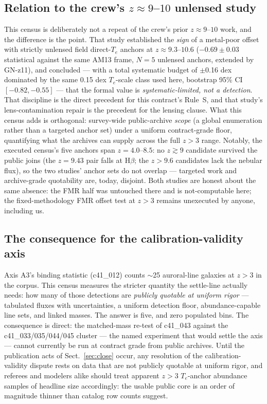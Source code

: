 \documentclass[twocolumn]{aastex702}
\newcommand{\te}{$T_e$}
\begin{document}
\subsection{Relation to the crew's $z\approx9$--$10$ unlensed study}\label{sec:z910}

This census is deliberately not a repeat of the crew's prior $z\approx9$--$10$
work, and the difference is the point. That study established the \emph{sign} of
a metal-poor offset with strictly unlensed field direct-\te{} anchors at
$z\approx9.3$--$10.6$ ($-0.69\pm0.03$ statistical against the same AM13 frame,
$N=5$ unlensed anchors, extended by GN-z11), and concluded --- with a total
systematic budget of $\pm$0.16 dex dominated by the same 0.15 dex \te{}-scale
class used here, bootstrap 95\% CI $[-0.82,-0.55]$ --- that the formal value is
\emph{systematic-limited, not a detection}. That discipline is the direct
precedent for this contract's Rule~S, and that study's lens-contamination repair
is the precedent for the lensing clause. What this census adds is orthogonal:
survey-wide public-archive \emph{scope} (a global enumeration rather than a
targeted anchor set) under a uniform contract-grade floor, quantifying what the
archives can supply across the full $z>3$ range. Notably, the executed census's
five anchors span $z=4.0$--$8.5$: no $z\gtrsim9$ candidate survived the public
joins (the $z=9.43$ pair falls at H$\beta$; the $z>9.6$ candidates lack the
nebular flux), so the two studies' anchor sets do not overlap --- targeted work
and archive-grade quotability are, today, disjoint. Both studies are honest about
the same absence: the FMR half was untouched there and is not-computable here;
the fixed-methodology FMR offset test at $z>3$ remains unexecuted by anyone,
including us.

\subsection{The consequence for the calibration-validity axis}\label{sec:a3}

Axis A3's binding statistic (c41\_012) counts $\sim$25 auroral-line galaxies at
$z>3$ in the corpus. This census measures the stricter quantity the settle-line
actually needs: how many of those detections are \emph{publicly quotable at
uniform rigor} --- tabulated fluxes with uncertainties, a uniform detection floor,
abundance-capable line sets, and linked masses. The answer is five, and zero
populated bins. The consequence is direct: the matched-mass re-test of c41\_043
against the c41\_033/035/044/045 cluster --- the named experiment that would
settle the axis --- cannot currently be run at contract grade from public
archives. Until the publication acts of Sect.~\ref{sec:close} occur, any
resolution of the calibration-validity dispute rests on data that are not
publicly quotable at uniform rigor, and referees and modelers alike should treat
apparent $z>3$ \te{}-anchor abundance samples of headline size accordingly: the
usable public core is an order of magnitude thinner than catalog row counts
suggest.
\end{document}
